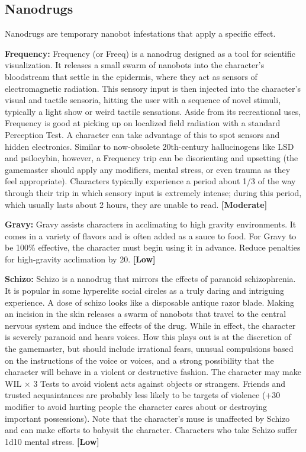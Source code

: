 \clearpage

\label{tab:drugs}


\subsection{Nanodrugs}
\label{sec:nanodrugs}

Nanodrugs are temporary nanobot infestations that apply a specific effect.

\textbf{Frequency:} Frequency (or Freeq) is a nanodrug designed as a tool for scientific visualization. It releases a small swarm of nanobots into the character’s bloodstream that settle in the epidermis, where they act as sensors of electromagnetic radiation. This sensory input is then injected into the character’s visual and tactile sensoria, hitting the user with a sequence of novel stimuli, typically a light show or weird tactile sensations. Aside from its recreational uses, Frequency is good at picking up on localized field radiation with a standard Perception Test. A character can take advantage of this to spot sensors and hidden electronics. Similar to now-obsolete 20th-century hallucinogens like LSD and psilocybin, however, a Frequency trip can be disorienting and upsetting (the gamemaster should apply any modifiers, mental stress, or even trauma as they feel appropriate). Characters typically experience a period about 1/3 of the way through their trip in which sensory input is extremely intense; during this period, which usually lasts about 2 hours, they are unable to read. \textbf{[Moderate]}

\textbf{Gravy:} Gravy assists characters in acclimating to high gravity environments. It comes in a variety of flavors and is often added as a sauce to food. For Gravy to be 100\% effective, the character must begin using it in advance. Reduce penalties for high-gravity acclimation by 20. \textbf{[Low]}

\textbf{Schizo:} Schizo is a nanodrug that mirrors the effects of paranoid schizophrenia. It is popular in some hyperelite social circles as a truly daring and intriguing experience. A dose of schizo looks like a disposable antique razor blade. Making an incision in the skin releases a swarm of nanobots that travel to the central nervous system and induce the effects of the drug. While in effect, the character is severely paranoid and hears voices. How this plays out is at the discretion of the gamemaster, but should include irrational fears, unusual compulsions based on the instructions of the voice or voices, and a strong possibility that the character will behave in a violent or destructive fashion. The character may make WIL $\times$ 3 Tests to avoid violent acts against objects or strangers. Friends and trusted acquaintances are probably less likely to be targets of violence (+30 modifier to avoid hurting people the character cares about or destroying important possessions). Note that the character’s muse is unaffected by Schizo and can make efforts to babysit the character. Characters who take Schizo suffer 1d10 mental stress. \textbf{[Low]}

